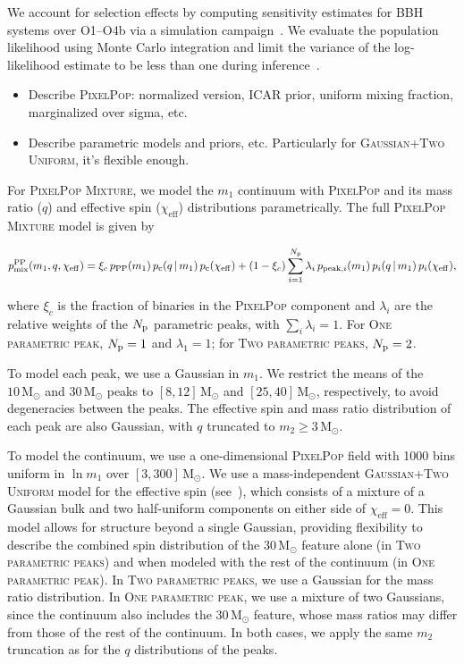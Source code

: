 \documentclass[twocolumn,twocolappendix,linenumbers]{aastex631}
\newcommand{\PixelPop}{\textsc{PixelPop}\xspace}
\newcommand{\PPMixture}{\textsc{PixelPop Mixture}\xspace}
\newcommand{\oneparpeak}{\textsc{One parametric peak}\xspace}
\newcommand{\twoparpeaks}{\textsc{Two parametric peaks}\xspace}
\newcommand{\gtwou}{\textsc{Gaussian+Two Uniform}\xspace}
\newcommand{\Msun}{\ensuremath{\mathrm{M}_\odot}\xspace}
\newcommand{\chieff}{\ensuremath{\chi_\mathrm{eff}}\xspace}
\begin{document}
We account for selection effects by computing sensitivity estimates for \acs{BBH} systems over O1--O4b via a simulation campaign~\citep{Essick:2025zed,ligo_scientific_collaboration_2026_19500052}.
We evaluate the population likelihood using Monte Carlo integration and limit the variance of the log-likelihood estimate to be less than one during inference~\citep{Tiwari:2017ndi,Essick:2022ojx,Talbot:2023pex,Heinzel:2025ogf}.

\begin{itemize}
    \item Describe \PixelPop: normalized version, ICAR prior, uniform mixing fraction, marginalized over sigma, etc.
    \item Describe parametric models and priors, etc. Particularly for \gtwou, it's flexible enough.
\end{itemize}

For \PPMixture, we model the $m_1$ continuum with \PixelPop and its mass ratio ($q$) and effective spin (\chieff) distributions parametrically.
The full \PPMixture model is given by

\begin{widetext}
\begin{equation}\label{eq:pp-mixture}
  p_{\rm mix}^{\rm PP}(m_1,q,\chieff) =
  \xi_c\,p_{\rm PP}(m_1)\,
  p_{\rm c}(q\,|\,m_1)\,p_{\rm c}(\chieff) +
  (1-\xi_c)\sum_{i=1}^{N_{\rm p}}
  \lambda_i\,p_{{\rm peak},i}(m_1)\,p_{i}(q\,|\,m_1)\,p_{i}(\chieff),
\end{equation}
\end{widetext}

where $\xi_c$ is the fraction of binaries in the \PixelPop component and $\lambda_i$ are the relative weights of the $N_{\rm p}$ parametric peaks, with $\sum_i \lambda_i = 1$.
For \oneparpeak, $N_{\rm p}=1$ and $\lambda_1=1$; for \twoparpeaks, $N_{\rm p}=2$.

To model each peak, we use a Gaussian in $m_1$.
We restrict the means of the $10\,\Msun$ and $30\,\Msun$ peaks to $[8, 12]\,\Msun$ and $[25, 40]\,\Msun$, respectively, to avoid degeneracies between the peaks.
The effective spin and mass ratio distribution of each peak are also Gaussian, with $q$ truncated to $m_2 \geq 3\,\Msun$.

To model the continuum, we use a one-dimensional \PixelPop field with 1000 bins uniform in $\ln m_1$ over $[3,300]\,\Msun$.
We use a mass-independent \gtwou model for the effective spin (see~\cite{Alvarez-Lopez:2026ymo}), which consists of a mixture of a Gaussian bulk and two half-uniform components on either side of $\chieff = 0$.
This model allows for structure beyond a single Gaussian, providing flexibility to describe the combined spin distribution of the $30\,\Msun$ feature alone (in \twoparpeaks) and when modeled with the rest of the continuum (in \oneparpeak).
In \twoparpeaks, we use a Gaussian for the mass ratio distribution.
In \oneparpeak, we use a mixture of two Gaussians, since the continuum also includes the $30\,\Msun$ feature, whose mass ratios may differ from those of the rest of the continuum.
In both cases, we apply the same $m_2$ truncation as for the $q$ distributions of the peaks.
\end{document}
